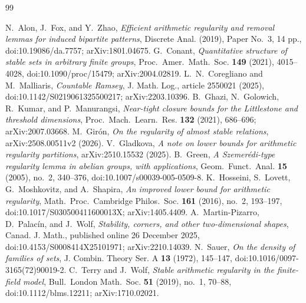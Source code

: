 \documentclass[11pt]{article}
\theoremstyle{plain}
\theoremstyle{definition}
\numberwithin{theorem}{section}
\begin{document}
\begin{thebibliography}{99}
\small
\raggedright
{}
  N.~Alon, J.~Fox, and Y.~Zhao,
  \emph{Efficient arithmetic regularity and removal lemmas for induced
    bipartite patterns},
  Discrete Anal. (2019), Paper No.~3, 14 pp.,
  doi:10.19086/da.7757; arXiv:1801.04675.
  G.~Conant,
  \emph{Quantitative structure of stable sets in arbitrary finite groups},
  Proc.\ Amer.\ Math.\ Soc. \textbf{149} (2021), 4015--4028,
  doi:10.1090/proc/15479; arXiv:2004.02819.
  L.~N.~Coregliano and M.~Malliaris,
  \emph{Countable Ramsey},
  J. Math. Log., article 2550021 (2025),
  doi:10.1142/S0219061325500217; arXiv:2203.10396.
  B.~Ghazi, N.~Golowich, R.~Kumar, and P.~Manurangsi,
  \emph{Near-tight closure bounds for the Littlestone and threshold
    dimensions},
  Proc.\ Mach.\ Learn.\ Res. \textbf{132} (2021), 686--696;
  arXiv:2007.03668.
  M.~Gir\'on,
  \emph{On the regularity of almost stable relations},
  arXiv:2508.00511v2 (2026).
  V.~Gladkova,
  \emph{A note on lower bounds for arithmetic regularity partitions},
  arXiv:2510.15532 (2025).
  B.~Green,
  \emph{A Szemer\'edi-type regularity lemma in abelian groups, with
    applications},
  Geom.\ Funct.\ Anal. \textbf{15} (2005), no.~2, 340--376,
  doi:10.1007/s00039-005-0509-8.
  K.~Hosseini, S.~Lovett, G.~Moshkovitz, and A.~Shapira,
  \emph{An improved lower bound for arithmetic regularity},
  Math.\ Proc.\ Cambridge Philos.\ Soc. \textbf{161} (2016), no.~2, 193--197,
  doi:10.1017/S030500411600013X; arXiv:1405.4409.
  A.~Martin-Pizarro, D.~Palac\'in, and J.~Wolf,
  \emph{Stability, corners, and other two-dimensional shapes},
  Canad. J. Math., published online 26 December 2025,
  doi:10.4153/S0008414X25101971; arXiv:2210.14039.
  N.~Sauer,
  \emph{On the density of families of sets},
  J. Combin. Theory Ser. A \textbf{13} (1972), 145--147,
  doi:10.1016/0097-3165(72)90019-2.
  C.~Terry and J.~Wolf,
  \emph{Stable arithmetic regularity in the finite-field model},
  Bull.\ London Math.\ Soc. \textbf{51} (2019), no.~1, 70--88,
  doi:10.1112/blms.12211; arXiv:1710.02021.
\end{thebibliography}
\end{document}
